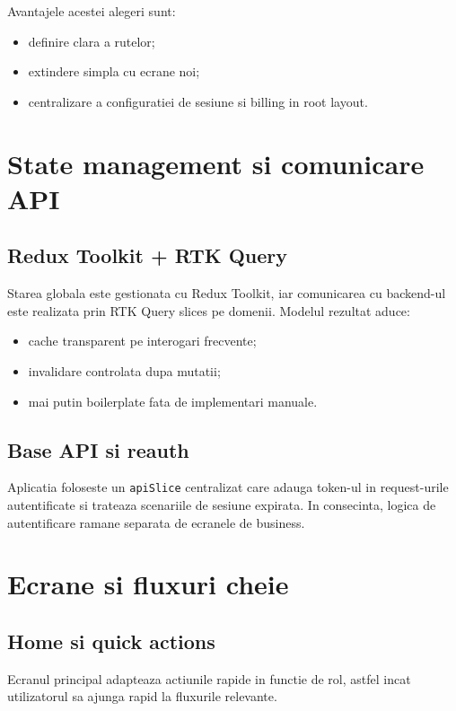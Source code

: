 Avantajele acestei alegeri sunt:
\begin{itemize}[leftmargin=1.2cm]
    \item definire clara a rutelor;
    \item extindere simpla cu ecrane noi;
    \item centralizare a configuratiei de sesiune si billing in root layout.
\end{itemize}

\section{State management si comunicare API}

\subsection{Redux Toolkit + RTK Query}

Starea globala este gestionata cu Redux Toolkit, iar comunicarea cu backend-ul este realizata prin RTK Query slices pe domenii. Modelul rezultat aduce:
\begin{itemize}[leftmargin=1.2cm]
    \item cache transparent pe interogari frecvente;
    \item invalidare controlata dupa mutatii;
    \item mai putin boilerplate fata de implementari manuale.
\end{itemize}

\subsection{Base API si reauth}

Aplicatia foloseste un \texttt{apiSlice} centralizat care adauga token-ul in request-urile autentificate si trateaza scenariile de sesiune expirata. In consecinta, logica de autentificare ramane separata de ecranele de business.

\section{Ecrane si fluxuri cheie}

\subsection{Home si quick actions}

Ecranul principal adapteaza actiunile rapide in functie de rol, astfel incat utilizatorul sa ajunga rapid la fluxurile relevante.

